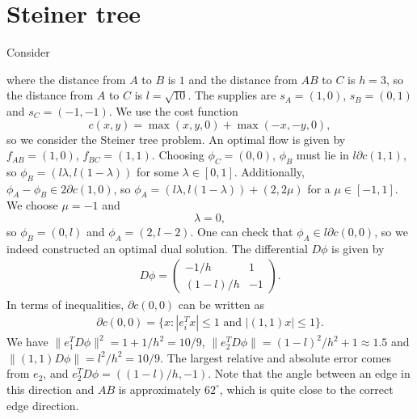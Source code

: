 \documentclass[10pt,a4paper]{article}
\begin{document}
\section{Steiner tree}
Consider
\begin{center}
\end{center}
where the distance from $A$ to $B$ is $1$ and the distance from $AB$ to $C$ is $h=3$, so the distance from $A$ to $C$ is $l = \sqrt{10}$. The supplies are $s_A = (1,0)$, $s_B = (0,1)$ and $s_C = (-1,-1)$. We use the cost function
\[
c(x,y) = \max(x,y,0) + \max(-x,-y,0),
\]
so we consider the Steiner tree problem. An optimal flow is given by $f_{AB} = (1,0)$, $f_{BC} = (1,1)$. Choosing $\phi_C = (0,0)$, $\phi_B$ must lie in $l\partial c(1,1)$, so $\phi_B = (l\lambda,l(1-\lambda))$ for some $\lambda \in [0,1]$. Additionally, $\phi_A-\phi_B \in 2\partial c(1,0)$, so $\phi_A = (l\lambda,l(1-\lambda)) + (2,2\mu)$ for a $\mu \in [-1,1]$. We choose $\mu = -1$ and
\[
\lambda = 0,
\]
so $\phi_B = (0,l)$ and $\phi_A = (2, l-2)$. One can check that $\phi_A \in l\partial c(0,0)$, so we indeed constructed an optimal dual solution. The differential $D\phi$ is given by
\begin{align*}
D\phi = \begin{pmatrix}
-1/h&1\\(1-l)/h&-1
\end{pmatrix}.
\end{align*}
In terms of inequalities, $\partial c(0,0)$ can be written as
\begin{align*}
\partial c(0,0) = \{x: |e_i^T x| \leq 1 \text{ and } |(1,1) x| \leq 1 \}.
\end{align*}
We have $\lVert e_1^T D\phi \rVert^2 = 1 + 1/h^2 = 10/9$, $\lVert e_2^T D\phi \rVert = (1-l)^2/h^2 + 1 \approx 1.5$ and $\rVert (1,1)D\phi \lVert= l^2/h^2 = 10/9$. The largest relative and absolute error comes from $e_2$, and $e_2^T D\phi = ((1-l)/h,-1)$. Note that the angle between an edge in this direction and  $AB$ is approximately $62^\circ$, which is quite close to the correct edge direction.
\end{document}
